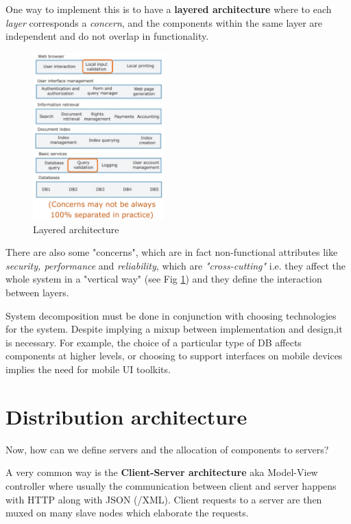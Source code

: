 One way to implement this is to have a \textbf{layered architecture} where to each \textit{layer} corresponds a \textit{concern}, and the components within the same layer are independent and do not overlap in functionality.
\begin{figure}[ht]
    \label{fig:layered_architecture}
    \centering
    \includegraphics[width=0.45\textwidth]{images/layered_architecture.png}
    \caption{Layered architecture}
\end{figure}
There are also some "concerns", which are in fact non-functional attributes like \textit{security, performance} and \textit{reliability}, which are \textit{"cross-cutting"} i.e. they affect the whole system in a "vertical way" (see Fig \ref{fig:layered_architecture}) and they define the interaction between layers.


System decomposition must be done in conjunction with choosing technologies for the system.
Despite implying a mixup between implementation and design,it is necessary.
For example, the choice of a particular type of DB affects components at higher levels, or choosing to support interfaces on mobile devices implies the need for mobile UI toolkits.

\section{Distribution architecture}
Now, how can we define servers and the allocation of components to servers?

A very common way is  the \textbf{Client-Server architecture}
aka Model-View controller where usually the communication between client and server happens with HTTP along with JSON (/XML).
Client requests to a server are then muxed on many slave nodes which elaborate the requests.

